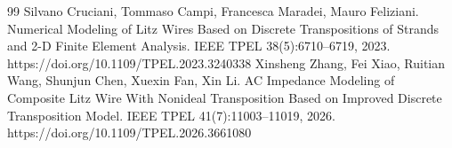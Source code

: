\documentclass[journal,10pt]{IEEEtran}
\begin{document}
\clearpage
\begin{thebibliography}{99}
 Silvano Cruciani, Tommaso Campi, Francesca Maradei, Mauro Feliziani. Numerical Modeling of Litz Wires Based on Discrete Transpositions of Strands and 2-D Finite Element Analysis. IEEE TPEL 38(5):6710–6719, 2023. https://doi.org/10.1109/TPEL.2023.3240338
 Xinsheng Zhang, Fei Xiao, Ruitian Wang, Shunjun Chen, Xuexin Fan, Xin Li. AC Impedance Modeling of Composite Litz Wire With Nonideal Transposition Based on Improved Discrete Transposition Model. IEEE TPEL 41(7):11003–11019, 2026. https://doi.org/10.1109/TPEL.2026.3661080
\end{thebibliography}
\end{document}
